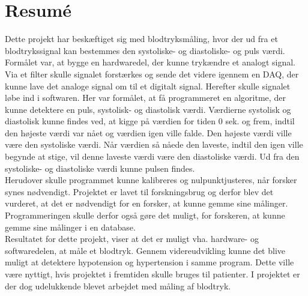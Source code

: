 \chapter{Resumé}
Dette projekt har beskæftiget sig med blodtryksmåling, hvor der ud fra et blodtrykssignal kan bestemmes den systoliske- og diastoliske- og puls værdi. Formålet var, at bygge en hardwaredel, der kunne trykændre et analogt signal. Via et filter skulle signalet forstærkes og sende det videre igennem en DAQ, der kunne lave det analoge signal om til et digitalt signal. Herefter skulle signalet løbe ind i softwaren. Her var formålet, at få programmeret en algoritme, der kunne detektere en puls, systolisk- og diastolisk værdi. Værdierne systolisk og diastolisk kunne findes ved, at kigge på værdien for tiden 0 sek. og frem, indtil den højeste værdi var nået og værdien igen ville falde. Den højeste værdi ville være den systoliske værdi. Når værdien så nåede den laveste, indtil den igen ville begynde at stige, vil denne laveste værdi være den diastoliske værdi. Ud fra den systoliske- og diastoliske værdi kunne pulsen findes. \\
Herudover skulle programmet kunne kalibreres og nulpunktjusteres, når forsker synes nødvendigt. Projektet er lavet til forskningsbrug og derfor blev det vurderet, at det er nødvendigt for en forsker, at kunne gemme sine målinger. Programmeringen skulle derfor også gøre det muligt, for forskeren, at kunne gemme sine målinger i en database.  \\
Resultatet for dette projekt, viser at det er muligt vha. hardware- og softwaredelen, at måle et blodtryk. Gennem videreudvikling kunne det blive muligt at detektere hypotension og hypertension i samme program. Dette ville være nyttigt, hvis projektet i fremtiden skulle bruges til patienter. I projektet er der dog udelukkende blevet arbejdet med måling af blodtryk. 
